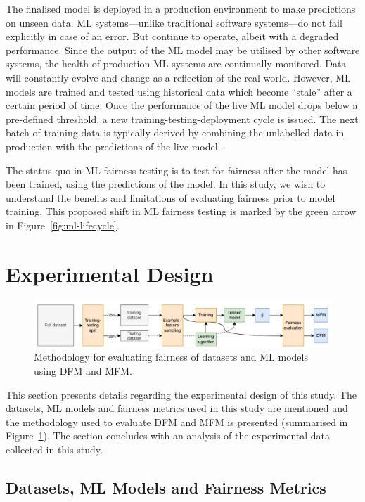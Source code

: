 \documentclass[sigconf,review,anonymous]{acmart}
\begin{document}
The finalised model is deployed in a production environment to make
predictions on unseen data. ML systems---unlike traditional software
systems---do not fail explicitly in case of an error. But continue to
operate, albeit with a degraded performance. Since the output of the
ML model may be utilised by other software systems, the health of
production ML systems are continually monitored. Data will constantly
evolve and change as a reflection of the real world. However, ML
models are trained and tested using historical data which become
``stale'' after a certain period of time. Once the performance of the
live ML model drops below a pre-defined threshold, a new
training-testing-deployment cycle is issued. The next batch of
training data is typically derived by combining the unlabelled data in
production with the predictions of the live
model \cite{breck2019data,hynes2017data,breck2017ml}.

The status quo in ML fairness testing is to test for fairness after
the model has been trained, using the predictions of the model. In
this study, we wish to understand the benefits and limitations of
evaluating fairness prior to model training. This proposed shift in ML
fairness testing is marked by the green arrow in
Figure \ref{fig:ml-lifecycle}.

\section{Experimental Design}\label{sec:method}

\begin{figure}
  \centering
  \includegraphics[width=\linewidth]{method.pdf}
  \caption{Methodology for evaluating fairness of datasets and ML
  models using DFM and MFM.}
  \label{fig:method}
\end{figure}

This section presents details regarding the experimental design of
this study. The datasets, ML models and fairness metrics used in this
study are mentioned and the methodology used to evaluate DFM and MFM
is presented (summarised in Figure \ref{fig:method}). The section
concludes with an analysis of the experimental data collected in this
study.

\subsection{Datasets, ML Models and Fairness Metrics}\label{sec:method-parameters}
\end{document}
